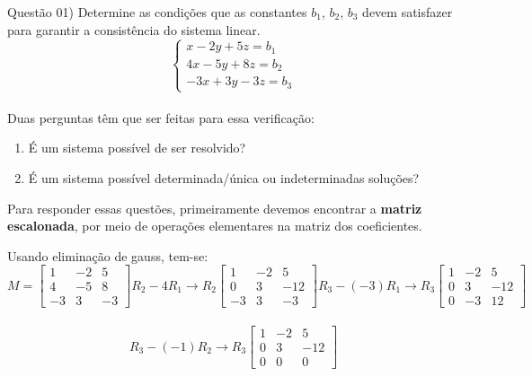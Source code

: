 
\noindent \textcolor{COLOR1}{Questão 01)} Determine as condições que as constantes $b_1$, $b_2$, $b_3$ devem satisfazer para garantir a consistência do sistema linear.
\\

\[
    \begin{cases}
        x - 2y + 5z = b_1  \\
        4x - 5y + 8z = b_2 \\
        -3x + 3y - 3z = b_3
    \end{cases}
\]
\\

Duas perguntas têm que ser feitas para essa verificação:
\\

\begin{enumerate}[label=(\alph*)]
    \item É um sistema possível de ser resolvido?
    \item É um sistema possível determinada/única ou indeterminadas soluções?
\end{enumerate}

Para responder essas questões, primeiramente devemos encontrar a \textbf{matriz escalonada}, por meio de operações elementares na matriz dos coeficientes.

Usando eliminação de gauss, tem-se:
\\

\[
    M=
    \begin{bmatrix}
        1  & -2 & 5  \\
        4  & -5 & 8  \\
        -3 & 3  & -3
    \end{bmatrix}
    R_2 - 4R_1 \to R_2
    \begin{bmatrix}
        1  & -2 & 5   \\
        0  & 3  & -12 \\
        -3 & 3  & -3
    \end{bmatrix}
    R_3 - (-3)R_1 \to  R_3
    \begin{bmatrix}
        1 & -2 & 5   \\
        0 & 3  & -12 \\
        0 & -3 & 12
    \end{bmatrix}
\]
\\

\[
    R_3 - (-1) R_2 \to R_3
    \begin{bmatrix}
        1 & -2 & 5   \\
        0 & 3  & -12 \\
        0 & 0  & 0
    \end{bmatrix}
\]
\\

